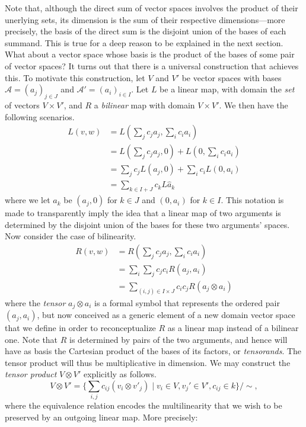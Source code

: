 Note that, although the direct sum of vector spaces involves the product of their unerlying sets, its dimension is the sum of their respective dimensions---more precisely, the basis of the direct sum is the disjoint union of the bases of each summand. This is true for a deep reason to be explained in the next section. What about a vector space whose basis is the product of the bases of some pair of vector spaces? It turns out that there is a universal construction that achieves this. To motivate this construction, let $V$ and $V'$ be vector spaces with bases $\mathcal{A}=(a_j)_{j\in J}$ and $\mathcal{A'}=(a_i)_{i\in I}$. Let $L$ be a linear map, with domain the \emph{set} of vectors $V\times V'$, and $R$ a \emph{bilinear} map with domain $V\times V'$. We then have the following scenarios.
\begin{align*}
    L(v,w) &= \textstyle L(\sum_jc_ja_j,\sum_ic_ia_i) \\ &= \textstyle L(\sum_jc_ja_j,0) + L(0,\sum_ic_ia_i) \\ 
    &=  \textstyle\sum_jc_j L(a_j,0) + \sum_ic_iL(0,a_i) \\
    &= \textstyle \sum_{k\in I+J}c_k L\hat{a}_k
\end{align*}
where we let $\hat{a}_k$ be $(a_j,0)$ for $k\in J$ and $(0,a_i)$ for $k\in I$. This notation is made to transparently imply the idea that a linear map of two arguments is determined by the disjoint union of the bases for these two arguments' spaces. Now consider the case of bilinearity.
\begin{align*}
    R(v,w) &= \textstyle R(\sum_jc_ja_j,\sum_ic_ia_i) \\
    &= \textstyle \sum_i\sum_j c_jc_i R(a_j,a_i) \\
    &= \textstyle\sum_{(i,j)\in I\times J}c_ic_j R(a_j\otimes a_i)
\end{align*}
where the \emph{tensor} $a_j\otimes a_i$ is a formal symbol that represents the ordered pair $(a_j,a_i)$, but now conceived as a generic element of a new domain vector space that we define in order to reconceptualize $R$ as a linear map instead of a bilinear one. Note that $R$ is determined by pairs of the two arguments, and hence will have as basis the Cartesian product of the bases of its factors, or \emph{tensorands}. The tensor product will thus be multiplicative in dimension. We may construct the \emph{tensor product} $V\otimes V'$ explicitly as follows. 
\[V\otimes V'=\textstyle\{\sum_{i,j}c_{ij}(v_i\otimes v'_j)\mid v_i\in V,v_j'\in V',c_{ij}\in k\}/\sim,\] where the equivalence relation encodes the multilinearity that we wish to be preserved by an outgoing linear map. More precisely: 
